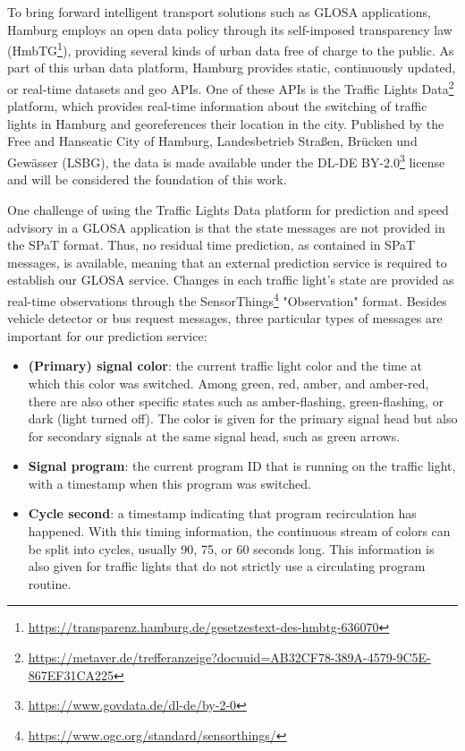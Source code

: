 To bring forward intelligent transport solutions such as GLOSA applications, Hamburg employs an open data policy through its self-imposed transparency law (HmbTG\footnote{\url{https://transparenz.hamburg.de/gesetzestext-des-hmbtg-636070}}), providing several kinds of urban data free of charge to the public. As part of this urban data platform, Hamburg provides static, continuously updated, or real-time datasets and geo APIs. One of these APIs is the Traffic Lights Data\footnote{\url{https://metaver.de/trefferanzeige?docuuid=AB32CF78-389A-4579-9C5E-867EF31CA225}} platform, which provides real-time information about the switching of traffic lights in Hamburg and georeferences their location in the city. Published by the Free and Hanseatic City of Hamburg, Landesbetrieb Straßen, Brücken und Gewässer (LSBG), the data is made available under the DL-DE BY-2.0\footnote{\url{https://www.govdata.de/dl-de/by-2-0}} license and will be considered the foundation of this work.

One challenge of using the Traffic Lights Data platform for prediction and speed advisory in a GLOSA application is that the state messages are not provided in the SPaT format. Thus, no residual time prediction, as contained in SPaT messages, is available, meaning that an external prediction service is required to establish our GLOSA service. Changes in each traffic light's state are provided as real-time observations through the SensorThings\footnote{\url{https://www.ogc.org/standard/sensorthings/}} "Observation" format. Besides vehicle detector or bus request messages, three particular types of messages are important for our prediction service:

\begin{itemize}
    \item \textbf{(Primary) signal color}: the current traffic light color and the time at which this color was switched. Among green, red, amber, and amber-red, there are also other specific states such as amber-flashing, green-flashing, or dark (light turned off). The color is given for the primary signal head but also for secondary signals at the same signal head, such as green arrows.
    \item \textbf{Signal program}: the current program ID that is running on the traffic light, with a timestamp when this program was switched.
    \item \textbf{Cycle second}: a timestamp indicating that program recirculation has happened. With this timing information, the continuous stream of colors can be split into cycles, usually 90, 75, or 60 seconds long. This information is also given for traffic lights that do not strictly use a circulating program routine.
\end{itemize}

